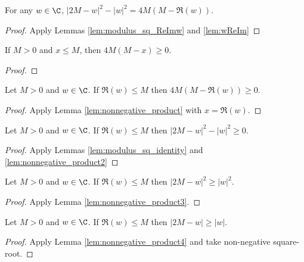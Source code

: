 \begin{lemma}\label{lem:modulus_sq_identity}  \leanok
For any $w \in \C$, $|2M-w|^2 - |w|^2 = 4M(M - \Re(w))$.
\end{lemma}
\begin{proof}  \leanok
Apply Lemmas \ref{lem:modulus_sq_ReImw} and \ref{lem:wReIm}
\end{proof}

\begin{lemma}\label{lem:nonnegative_product}  \leanok
If $M>0$ and $x \le M$, then $4M(M-x) \ge 0$.
\end{lemma}
\begin{proof} \leanok
\end{proof}

\begin{lemma}\label{lem:nonnegative_product2}  \leanok
Let $M>0$ and $w\in\C$. If $\Re(w) \le M$ then $4M(M-\Re(w)) \ge 0$.
\end{lemma}
\begin{proof} \leanok {}
Apply Lemma \ref{lem:nonnegative_product} with $x=\Re(w)$.
\end{proof}


\begin{lemma}\label{lem:nonnegative_product3}  \leanok
Let $M>0$ and $w \in \C$. If $\Re(w) \le M$ then $|2M-w|^2 - |w|^2 \ge 0$.
\end{lemma}
\begin{proof} \leanok {}
Apply Lemmas \ref{lem:modulus_sq_identity} and \ref{lem:nonnegative_product2}
\end{proof}

\begin{lemma}\label{lem:nonnegative_product4}  \leanok
Let $M>0$ and $w \in \C$. If $\Re(w) \le M$ then $|2M-w|^2 \ge |w|^2$.
\end{lemma}
\begin{proof} \leanok {}
Apply Lemma \ref{lem:nonnegative_product3}.
\end{proof}

\begin{lemma}\label{lem:nonnegative_product5}  \leanok
Let $M>0$ and $w \in \C$. If $\Re(w) \le M$ then $|2M-w| \ge |w|$.
\end{lemma}
\begin{proof} \leanok {}
Apply Lemma \ref{lem:nonnegative_product4} and take non-negative square-root.
\end{proof}

